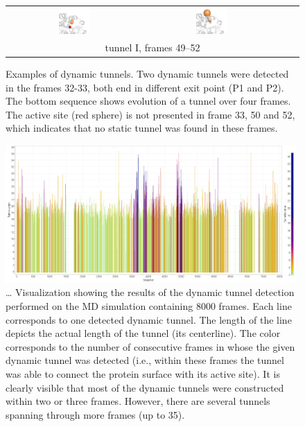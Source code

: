 \documentclass[usletter, 10pt, conference]{svjour3}      %
\begin{document}
\begin{figure}
{\begin{tabular}{cccc}
\includegraphics[width=0.24\textwidth]{fig/framed-0053-000-0051} &
\includegraphics[width=0.24\textwidth]{fig/framed-0053-000-0053} \\
\multicolumn{4}{c}{tunnel I, frames 49--52} \\
\end{tabular}
\caption{\label{fig::seq1}
Examples of dynamic tunnels.
Two dynamic tunnels were detected in the frames 32-33, both end in different exit point (P1 and P2).
The bottom sequence shows evolution of a tunnel over four frames.
The active site (red sphere) is not presented in frame 33, 50 and 52, which indicates that no static tunnel
was found in these frames.
}
}
\end{figure}



\begin{figure}
\centering
\includegraphics[width=0.99\textwidth]{fig/5}
\caption{\label{fig::vis1}
… Visualization showing the results of the dynamic tunnel detection performed on the MD simulation containing 8000 frames. 
  Each line corresponds to one detected dynamic tunnel.
  The length of the line depicts the actual length of the tunnel (its centerline). 
  The color corresponds to the number of consecutive frames in whose the given dynamic tunnel was detected (i.e., within these frames the tunnel was able to connect the protein surface with its active site).
    It is clearly visible that most of the dynamic tunnels were constructed within two or three frames. However, there are several tunnels spanning through more frames (up to 35).
}
\end{figure}
\end{document}
